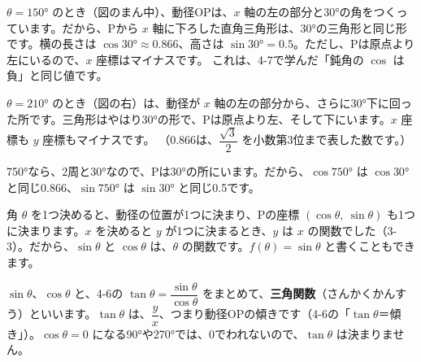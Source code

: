 $\theta=150°$ のとき（図のまん中）、動径OPは、$x$ 軸の左の部分と30°の角をつくっています。だから、Pから $x$ 軸に下ろした直角三角形は、30°の三角形と同じ形です。横の長さは $\cos30°\approx0.866$、高さは $\sin30°=0.5$。ただし、Pは原点より左にいるので、$x$ 座標はマイナスです。
これは、4-7で学んだ「鈍角の $\cos$ は負」と同じ値です。

$\theta=210°$ のとき（図の右）は、動径が $x$ 軸の左の部分から、さらに30°下に回った所です。三角形はやはり30°の形で、Pは原点より左、そして下にいます。$x$ 座標も $y$ 座標もマイナスです。
{\small（0.866は、$\dfrac{\sqrt3}{2}$ を小数第3位まで表した数です。）}\par
750°なら、2周と30°なので、Pは30°の所にいます。だから、$\cos750°$ は $\cos30°$ と同じ0.866、$\sin750°$ は $\sin30°$ と同じ0.5です。

\begin{bkfigure}
\end{bkfigure}

角 $\theta$ を1つ決めると、動径の位置が1つに決まり、Pの座標 $(\cos\theta,\ \sin\theta)$ も1つに決まります。$x$ を決めると $y$ が1つに決まるとき、$y$ は $x$ の関数でした（3-3）。だから、$\sin\theta$ と $\cos\theta$ は、$\theta$ の関数です。$f(\theta)=\sin\theta$ と書くこともできます。

$\sin\theta$、$\cos\theta$ と、4-6の $\tan\theta=\dfrac{\sin\theta}{\cos\theta}$ をまとめて、\textbf{三角関数}（さんかくかんすう）といいます。$\tan\theta$ は、$\dfrac{y}{x}$、つまり動径OPの傾きです（4-6の「$\tan\theta$＝傾き」）。$\cos\theta=0$ になる90°や270°では、0でわれないので、$\tan\theta$ は決まりません。

